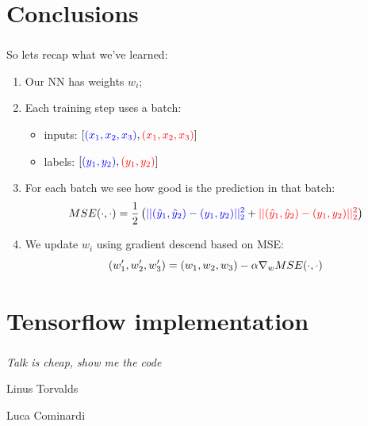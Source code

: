 \documentclass{beamer}
\begin{document}
\section{Conclusions}
\begin{frame}
    \frametitle{\insertsection}
    So lets recap what we've learned:
    \begin{enumerate}
        \item<1-> Our NN has weights $w_i$;
        \item<2-> Each training step uses a batch:
            \begin{itemize}
                \item inputs: $[{\color{blue}(x_1,x_2,x_3)}, {\color{red}(x_1,x_2,x_3)}]$
                \item labels: $[{\color{blue}(y_1,y_2)}, {\color{red}(y_1,y_2)}]$
            \end{itemize}
        \item<3-> For each batch we see how good is the prediction in that batch:
            \begin{equation*}
                MSE({\color{blue} \cdot}, {\color{red}\cdot})= \frac{1}{2}\left( {\color{blue} || (\hat{y}_1, \hat{y}_2) - (y_1,y_2) ||_2^2} + {\color{red}|| (\hat{y}_1, \hat{y}_2) - (y_1,y_2) ||_2^2 } \right)
            \end{equation*}
        \item<4-> We update $w_i$ using gradient descend based on MSE:
            \begin{equation*}
                (w_1',w_2',w_3') = (w_1,w_2,w_3) - \alpha \nabla_w MSE({\color{blue} \cdot}, {\color{red}\cdot})
            \end{equation*}
    \end{enumerate}
\end{frame}


\section{Tensorflow implementation}
\begin{frame}[fragile]
    \frametitle{\insertsection}
    \vfill

    \textit{Talk is cheap, show me the code}

    \hfill Linus Torvalds

    {\hfill Luca Cominardi
    }
    \vfill
\end{frame}
\end{document}

